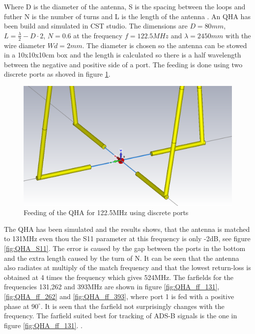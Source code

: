 Where D is the diameter of the antenna, S is the spacing between the loops and futher N is the number of turns and L is the length of the antenna \citep{Balanis2005}.
\newline
\newline
An QHA has been build and simulated in CST studio. The dimensions are $D=80mm$,$L=\frac{\lambda}{2}-D\cdot 2$, $N=0.6$ at the frequency $f=122.5MHz$ and $\lambda = 2450mm$ with the wire diameter $Wd = 2mm$. The diameter is chosen so the antenna can be stowed in a 10x10x10cm box and the length is calculated so there is a half wavelength between the negative and positive side of a port. The feeding is done using two discrete ports as shoved in figure \ref{fig:QHA2}.  

\begin{figure}[H]
\centering 
\includegraphics[scale = 0.4]{figures/antennas/qha/qha_6_feeding}
\caption{Feeding of the QHA for 122.5MHz using discrete ports}
\label{fig:QHA2}
\end{figure}
 
The QHA has been simulated and the results shows, that the antenna is matched to 131MHz even thou the S11 parameter at this frequency is only -2dB, see figure \ref{fig:QHA_S11}. The error is caused by the gap between the ports in the bottom and the extra length caused by the turn of N. It can be seen that the antenna also radiates at multiply of the match frequency and that the lowest return-loss is obtained at 4 times the frequency which gives 524MHz. The farfields for the frequencies 131,262 and 393MHz are shown in figure \ref{fig:QHA_ff_131}, \ref{fig:QHA_ff_262} and \ref{fig:QHA_ff_393}, where port 1 is fed with a positive phase at $90^\circ$. It is seen that the farfield not surprisingly changes with the frequency. The farfield suited best for tracking of ADS-B signals is the one in figure \ref{fig:QHA_ff_131}. .      


